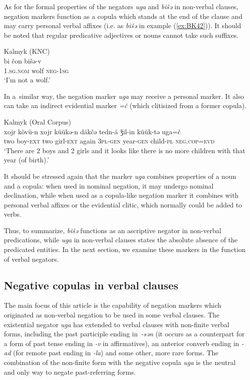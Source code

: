 \documentclass[output=paper]{langsci/langscibook}
\begin{document}
As for the formal properties of the negators \textit{uga} and \textit{bišǝ} in non-verbal clauses, negation markers function as a copula which stands at the end of the clause and may carry personal verbal affixes (i.e. as \textit{bišǝ} in example (\ref{ex:BK42})). It should be noted that regular predicative adjectives or nouns cannot take such suffixes.

\ea Kalmyk (KNC) \label{ex:BK42}\\
	\gll bi				čon	bišə-v\\
	\textsc{1.sg.nom}	wolf	\textsc{neg-1sg}\\
	\glt `I’m not a wolf.'
\z


In a similar way, the negation marker \textit{uga} may receive a personal marker. It also can take an indirect evidential marker \textit{=č} (which clitisized from a former copula).

\ea Kalmyk (Oral Corpus) \label{ex:BK43}\\
	\gll xojr	kövü-n		xojr	küükǝ-n	däkčǝ		tedn-ä	ǯil-in			küük-tǝ	uga=č\\
	two	boy-\textsc{ext}		two	girl-\textsc{ext}	again		\textsc{3pl-gen}	year-\textsc{gen}		child-\textsc{pl}	\textsc{neg.cop=evd}\\
	\glt `There are 2 boys and 2 girls and it looks like there is no more children with that year (of birth).'
\z


It should be stressed again that the marker \textit{uga} combines properties of a noun and a copula: when used in nominal negation, it may undergo nominal declination, while when used as a copula-like negation marker it combines with personal verbal affixes or the evidential clitic, which normally could be added to verbs.

Thus, to summarize, \textit{bišǝ} functions as an ascriptive negator in non-verbal predications, while \textit{uga} in non-verbal clauses states the absolute absence of the predicated entities. In the next section, we examine these markers in the function of verbal negators.

\subsection{Negative copulas in verbal clauses}\label{sec:BK3.3}

The main focus of this article is the capability of negation markers which originated as non-verbal negation to be used in some verbal clauses. The existential negator \textit{uga} has extended to verbal clauses with non-finite verbal forms, including the past participle ending in \textit{-sǝn} (it occurs as a counterpart for a form of past tense ending in \textit{-v} in affirmatives), an anterior converb ending in \textit{-ad} (for remote past ending in \textit{-la}) and some other, more rare forms. The combination of the non-finite form with the negative copula \textit{uga} is the neutral and only way to negate past-referring forms.
\end{document}
